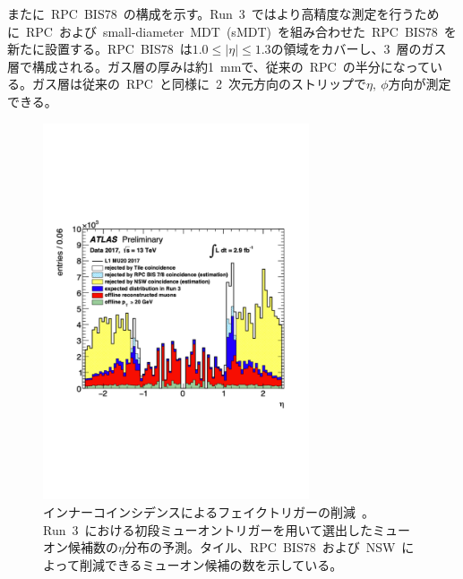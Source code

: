 またに~RPC~BIS78~の構成を示す。Run~3~ではより高精度な測定を行うために~RPC~および~small-diameter~MDT~(sMDT)~を組み合わせた~RPC~BIS78~を新たに設置する。RPC~BIS78~は$1.0{\leq}|\eta|{\leq}1.3$の領域をカバーし、3~層のガス層で構成される。ガス層の厚みは約1~mmで、従来の~RPC~の半分になっている。ガス層は従来の~RPC~と同様に~2~次元方向のストリップで$\eta,~\phi$方向が測定できる。

\begin{figure}[H]
        \centering   
        \includegraphics[width=0.7\textwidth,page=1]{img/pdf/inner.pdf}
        \caption[インナーコインシデンスによるフェイクトリガーの削減]{インナーコインシデンスによるフェイクトリガーの削減~\cite{TR:06}。Run~3~における初段ミューオントリガーを用いて選出したミューオン候補数の$\eta$分布の予測。タイル、RPC~BIS78~および~NSW~によって削減できるミューオン候補の数を示している。}
        \label{fig:innercoin}
\end{figure}

